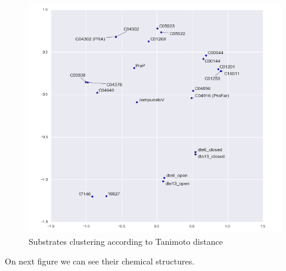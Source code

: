 \documentclass[12pt,twoside]{reedthesis}
\begin{document}
  \begin{figure}[h!tbp]
  \centering
  \includegraphics[angle = 0,scale = 0.6]{chapter4/SubstratesClustering.png}
  \caption[Substrates clustering according to Tanimoto distance]{\normalsize{Substrates clustering according to Tanimoto distance}}
  \label{fig:Substrates Tanimoto distance}
  \end{figure}
  
  On next figure we can see their chemical structures.
  
  \clearpage   
  
\end{document}
